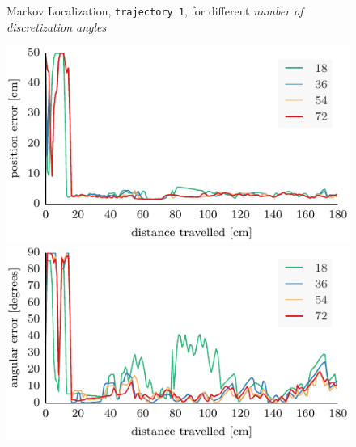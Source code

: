 \documentclass[letterpaper, 10pt, conference]{ieeeconf}
\begin{document}
\begin{figure}

\begin{center}
Markov Localization, \texttt{trajectory~1}, for different \emph{number of discretization angles}
\end{center}
\includegraphics{ml-whole_random_1-xy}\hfill
\includegraphics{ml-whole_random_1-theta}

\vspace{.3em}


\end{figure}
\end{document}
